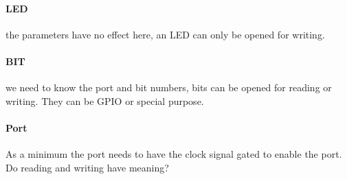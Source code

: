 \documentclass{tufte-handout}
\begin{document}
\paragraph{LED} the parameters have no effect here, an LED can only be opened for writing.
\paragraph{BIT} we need to know the port and bit numbers, bits can be opened for reading or writing.   They can be GPIO or special purpose.
\paragraph{Port} As a minimum the port needs to have the clock signal gated to enable the port.  Do reading and writing have meaning?
\end{document}
